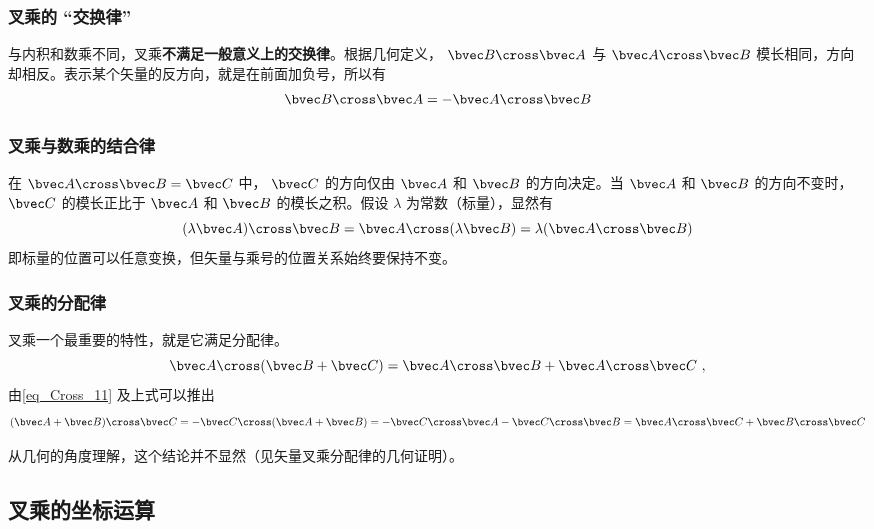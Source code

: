 \subsubsection{叉乘的 “交换律”}
与内积和数乘不同，叉乘\textbf{不满足一般意义上的交换律}。根据几何定义， $\bvec B \cross \bvec A$ 与 $\bvec A \cross \bvec B$ 模长相同，方向却相反。表示某个矢量的反方向，就是在前面加负号，所以有
\begin{equation}\label{eq_Cross_11}
\bvec B \cross \bvec A = -\bvec A \cross \bvec B
\end{equation}

\subsubsection{叉乘与数乘的结合律}

在 $\bvec A \cross \bvec B = \bvec C$ 中， $\bvec C$ 的方向仅由 $\bvec A$ 和 $\bvec B$ 的方向决定。当 $\bvec A$ 和 $\bvec B$ 的方向不变时， $\bvec C$ 的模长正比于 $\bvec A$ 和 $\bvec B$ 的模长之积。假设 $\lambda $ 为常数（标量），显然有
\begin{equation}
(\lambda \bvec A) \cross \bvec B = \bvec A \cross (\lambda \bvec B) = \lambda (\bvec A \cross \bvec B)
\end{equation}
即标量的位置可以任意变换，但矢量与乘号的位置关系始终要保持不变。

\subsubsection{叉乘的分配律}

叉乘一个最重要的特性，就是它满足分配律。
\begin{equation}\label{eq_Cross_6}
\bvec A \cross (\bvec B +\bvec C) = \bvec A \cross \bvec B + \bvec A \cross \bvec C~,
\end{equation}
由\autoref{eq_Cross_11} 及上式可以推出
\begin{equation}\label{eq_Cross_7}
(\bvec A + \bvec B) \cross \bvec C =  - \bvec C \cross (\bvec A + \bvec B) =  - \bvec C \cross \bvec A - \bvec C \cross \bvec B = \bvec A \cross \bvec C + \bvec B \cross \bvec C
\end{equation}

从几何的角度理解，这个结论并不显然（见矢量叉乘分配律的几何证明）。

\subsection{叉乘的坐标运算}
